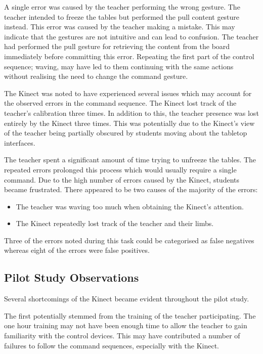 \documentclass[link]{IWCOMP}
\begin{document}
A single error was caused by the teacher performing the wrong gesture.
The teacher intended to freeze the tables but performed the pull content gesture instead. 
This error was caused by the teacher making a mistake.
This may indicate that the gestures are not intuitive and can lead to confusion.
The teacher had performed the pull gesture for retrieving the content from the board immediately before committing this error.
Repeating the first part of the control sequence; waving, may have led to them continuing with the same actions without realising the need to change the command gesture.

The Kinect was noted to have experienced several issues which may account for the observed errors in the command sequence.
The Kinect lost track of the teacher's calibration three times.
In addition to this, the teacher presence was lost entirely by the Kinect three times.
This was potentially due to the Kinect's view of the teacher being partially obscured by students moving about the tabletop interfaces.

The teacher spent a significant amount of time trying to unfreeze the tables.
The repeated errors prolonged this process which would usually require a single command.
Due to the high number of errors caused by the Kinect, students became frustrated.
There appeared to be two causes of the majority of the errors:

\begin{itemize}
\item The teacher was waving too much when obtaining the Kinect's attention.
\item The Kinect repeatedly lost track of the teacher and their limbs. 
\end{itemize}

Three of the errors noted during this task could be categorised as false negatives whereas eight of the errors were false positives.

\subsection{Pilot Study Observations}
\label{subsec:pilotdiscussion}

Several shortcomings of the Kinect became evident throughout the pilot study.

The first potentially stemmed from the training of the teacher participating.
The one hour training may not have been enough time to allow the teacher to gain familiarity with the control devices.
This may have contributed a number of failures to follow the command sequences, especially with the Kinect.
\end{document}
